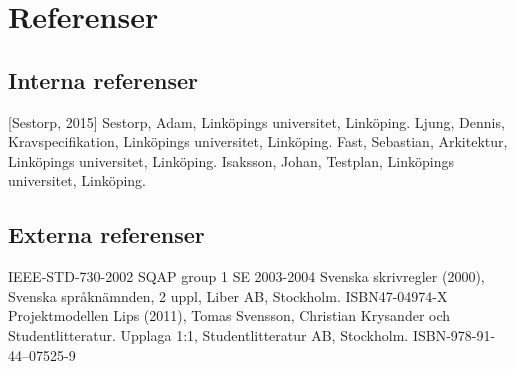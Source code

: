 \section{Referenser}


\subsection{Interna referenser}
[Sestorp, 2015] Sestorp, Adam, Linköpings universitet, Linköping.
\newline
\newline
[Ljung, 2015] Ljung, Dennis, Kravspecifikation, Linköpings universitet, Linköping.
\newline
\newline
[Fast, 2015] Fast, Sebastian, Arkitektur, Linköpings universitet, Linköping.
\newline
\newline
[Isaksson, 2015] Isaksson, Johan, Testplan, Linköpings universitet, Linköping.

\subsection{Externa referenser}
IEEE-STD-730-2002 SQAP group 1 SE 2003-2004
\newline
\newline
Svenska skrivregler (2000), Svenska språknämnden, 2 uppl, Liber AB, Stockholm. ISBN47-04974-X
\newline
\newline
Projektmodellen Lips (2011), Tomas Svensson, Christian Krysander och Studentlitteratur. Upplaga 1:1, Studentlitteratur AB, Stockholm. ISBN-978-91-44--07525-9